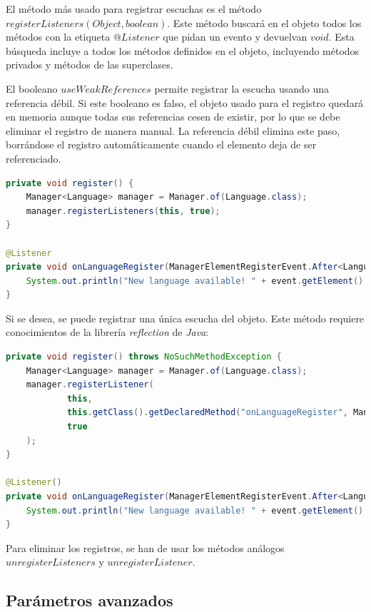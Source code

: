 \noindent El método más usado para registrar escuchas es el método
$registerListeners(Object, boolean)$.
Este método buscará en el objeto todos los métodos con la etiqueta $@Listener$
que pidan un evento y devuelvan $void$.
Esta búsqueda incluye a todos los métodos definidos en el objeto,
incluyendo métodos privados y métodos de las superclases.

\noindent El booleano $useWeakReferences$ permite registrar la escucha usando una referencia débil.
Si este booleano es falso, el objeto usado para el registro quedará en memoria aunque todas
sus referencias cesen de existir, por lo que se debe eliminar el registro de manera manual.
La referencia débil elimina este paso, borrándose el registro automáticamente cuando
el elemento deja de ser referenciado.

\begin{lstlisting}[language=Java,style=java,frame=single,label={lst:registrar-escuchas}]
private void register() {
    Manager<Language> manager = Manager.of(Language.class);
    manager.registerListeners(this, true);
}

@Listener
private void onLanguageRegister(ManagerElementRegisterEvent.After<Language> event) {
    System.out.println("New language available! " + event.getElement().getName());
}
\end{lstlisting}

\noindent Si se desea, se puede registrar una única escucha del objeto.
Este método requiere conocimientos de la librería \textit{reflection} de \textit{Java}:

\begin{lstlisting}[language=Java,style=java,frame=single,label={lst:registrar-escuchas-2}]
private void register() throws NoSuchMethodException {
    Manager<Language> manager = Manager.of(Language.class);
    manager.registerListener(
            this,
            this.getClass().getDeclaredMethod("onLanguageRegister", ManagerElementRegisterEvent.class),
            true
    );
}

@Listener()
private void onLanguageRegister(ManagerElementRegisterEvent.After<Language> event) {
    System.out.println("New language available! " + event.getElement().getName());
}
\end{lstlisting}

\noindent Para eliminar los registros, se han de usar los métodos análogos
$unregisterListeners$ y $unregisterListener$.

\subsection{Parámetros avanzados}\label{subsec:parámetros-avanzados}

